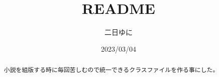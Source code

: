 \documentclass{jlreq}
\title{README}
\author{二日ゆに}
\date{2023/03/04}
\begin{document}
\maketitle

\begin{abstract}
    小説を組版する時に毎回苦しむので統一できるクラスファイルを作る事にした。
\end{abstract}
\end{document}
